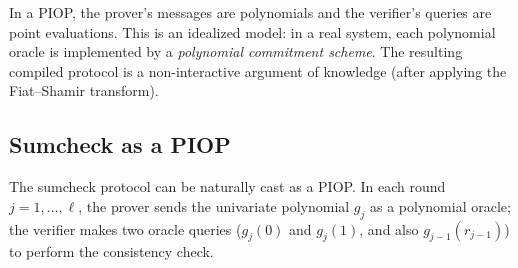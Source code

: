 \documentclass[11pt]{article}
\begin{document}
\begin{remark}
In a PIOP, the prover's messages are polynomials and the verifier's queries are point evaluations.  This is an idealized model: in a real system, each polynomial oracle is implemented by a \emph{polynomial commitment scheme}.  The resulting compiled protocol is a non-interactive argument of knowledge (after applying the Fiat--Shamir transform).
\end{remark}

\subsection{Sumcheck as a PIOP}

The sumcheck protocol can be naturally cast as a PIOP.  In each round $j = 1, \ldots, \ell$, the prover sends the univariate polynomial $g_j$ as a polynomial oracle; the verifier makes two oracle queries ($g_j(0)$ and $g_j(1)$, and also $g_{j-1}(r_{j-1})$) to perform the consistency check.
\end{document}
